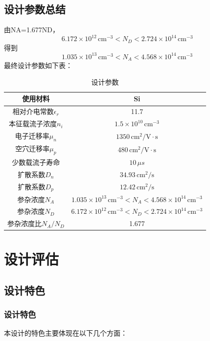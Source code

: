 \documentclass[12pt,hyperref,a4paper,UTF8]{ctexart}
\begin{document}
\subsection*{设计参数总结}
由NA=1.677ND，
\[6.172 \times 10^{12} \, \text{cm}^{-3} < N_D < 2.724 \times 10^{14} \, \text{cm}^{-3} \]
得到
\[1.035 \times 10^{13} \, \text{cm}^{-3} < N_A < 4.568 \times 10^{14} \, \text{cm}^{-3} \]
最终设计参数如下表：
\begin{table}[H]
    \centering
    \caption{设计参数}
    \begin{tabular}{|c|c|}
        \hline
        使用材料 & Si \\
        \hline
        相对介电常数$\epsilon_r$ & 11.7 \\
        \hline
        本征载流子浓度$n_i$ & $1.5 \times 10^{10} \, \text{cm}^{-3}$ \\
        \hline
        电子迁移率$\mu_n$ & $1350 \, \text{cm}^2/\text{V}\cdot\text{s}$ \\
        \hline
        空穴迁移率$\mu_p$ & $480 \, \text{cm}^2/\text{V}\cdot\text{s}$ \\
        \hline
        少数载流子寿命 & $10 \, \mu s$ \\
        \hline
        扩散系数$D_n$ & $34.93 \, \text{cm}^2/\text{s}$ \\
        \hline
        扩散系数$D_p$ & $12.42 \, \text{cm}^2/\text{s}$ \\
        \hline
        参杂浓度$N_A$ & $1.035 \times 10^{13} \, \text{cm}^{-3} < N_A < 4.568 \times 10^{14} \, \text{cm}^{-3}$ \\
        \hline
        参杂浓度$N_D$ & $6.172 \times 10^{12} \, \text{cm}^{-3} < N_D < 2.724 \times 10^{14} \, \text{cm}^{-3}$ \\
        \hline
        参杂浓度比$N_A/N_D$ & 1.677 \\
        \hline
    \end{tabular}
\end{table}

\newpage

\section{设计评估}

\subsection{设计特色}
\subsubsection*{设计特色}
本设计的特色主要体现在以下几个方面：
\end{document}
